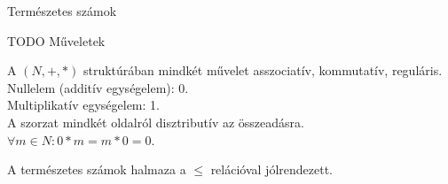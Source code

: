 \documentclass{beamer}
\begin{document}
\begin{frame}

\begin{tcolorbox}
{\Huge Természetes számok}
\end{tcolorbox}
\end{frame}

\begin{frame}
\begin{tcolorbox}[title={Def.: Peano-axiómák}]
\end{tcolorbox}

\begin{tcolorbox}[title={Ész}]
\end{tcolorbox}

\begin{tcolorbox}[title={Def.: Természetes számok halmaza}]
\end{tcolorbox}
\end{frame}

\begin{frame}
\begin{tcolorbox}[title={Def.:}]
TODO Műveletek
\end{tcolorbox}
\end{frame}

\begin{frame}
\begin{tcolorbox}[title={Tétel: Természetes számok}]
A $(N, +, *)$ struktúrában mindkét művelet asszociatív, kommutatív, reguláris.\\
Nullelem (additív egységelem): 0.\\
Multiplikatív egységelem: 1.\\
A szorzat mindkét oldalról disztributív az összeadásra.\\
${\forall}m \in N : 0 * m = m * 0 = 0$.
\end{tcolorbox}
\end{frame}

\begin{frame}
\begin{tcolorbox}[title={Def.: $\mathbb{N}$ rendezése}]
\end{tcolorbox}

\begin{tcolorbox}[title={Tétel: N rendezése}]
A természetes számok halmaza a $\leq$ relációval jólrendezett.
\end{tcolorbox}

\begin{tcolorbox}[title={Def.: Végtelen sorozatok}]
\end{tcolorbox}


\begin{tcolorbox}[title={Ész}]
\end{tcolorbox}
\end{frame}
\end{document}
